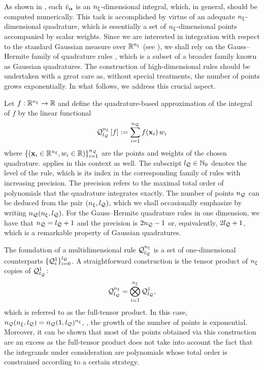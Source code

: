As shown in , each $\hat{v}_{\bm{\alpha}}$ is an ${n_\xi}$-dimensional integral, which, in general, should be computed numerically.
This task is accomplished by virtue of an adequate ${n_\xi}$-dimensional quadrature, which is essentially a set of ${n_\xi}$-dimensional points accompanied by scalar weights.
Since we are interested in integration with respect to the standard Gaussian measure over $\mathbb{R}^{n_\xi}$ (see ), we shall rely on the Gauss--Hermite family of quadrature rules \cite{maitre2010}, which is a subset of a broader family known as Gaussian quadratures.
The construction of high-dimensional rules should be undertaken with a great care as, without special treatments, the number of points grows exponentially.
In what follows, we address this crucial aspect.

Let $f: \mathbb{R}^{n_\xi} \to \mathbb{R}$ and define the quadrature-based approximation of the integral of $f$ by the linear functional
\[
  \quadrature{\nvars}{\nqlevel}{f} := \sum_{i = 1}^\nqorder f(\point_i) \, \weight_i
\]
where $\{ (\mathbf{x}_i \in \mathbb{R}^{n_\xi}, w_i \in \mathbb{R}) \}_{i = 1}^{n_\mathcal{Q}}$ are the points and weights of the chosen quadrature.
 applies in this context as well.
The subscript ${l_\mathcal{Q}} \in \mathbb{N}_{0}$ denotes the level of the rule, which is its index in the corresponding family of rules with increasing precision.
The precision refers to the maximal total order of polynomials that the quadrature integrates exactly.
The number of points ${n_\mathcal{Q}}$ can be deduced from the pair $({n_\xi}, {l_\mathcal{Q}})$, which we shall occasionally emphasize by writing ${n_\mathcal{Q}}({n_\xi}, {l_\mathcal{Q}})$.
For the Gauss--Hermite quadrature rules in one dimension, we have that ${n_\mathcal{Q}} = {l_\mathcal{Q}} + 1$ and the precision is $2 {n_\mathcal{Q}} - 1$ or, equivalently, $2 {l_\mathcal{Q}} + 1$, which is a remarkable property of Gaussian quadratures.

The foundation of a multidimensional rule $\quadrature$ is a set of one-dimensional counterparts $\{ \quadrature{1}{i} \}_{i = 0}^\nqlevel$.
A straightforward construction is the tensor product of ${n_\xi}$ copies of $\quadrature{1}{\nqlevel}$:
\begin{equation} \xelab{full-tensor-product-grid}
  \quadrature = \bigotimes_{i = 1}^\nvars \quadrature{1}{\nqlevel},
\end{equation}
which is referred to as the full-tensor product.
In this case, ${n_\mathcal{Q}}({n_\xi}, {l_\mathcal{Q}}) = {n_\mathcal{Q}}(1, {l_\mathcal{Q}})^{n_\xi}$, \ie, the growth of the number of points is exponential.
Moreover, it can be shown that most of the points obtained via this construction are an excess as the full-tensor product does not take into account the fact that the integrands under consideration are polynomials whose total order is constrained according to a certain strategy.

